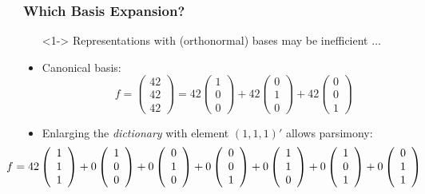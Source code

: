 \documentclass[dvips]{beamer}
\newcommand{\bs}[2]{\begin{frame} \frametitle{#1} 
{#2}
\end{frame} }
\begin{document}
\bs{Which Basis Expansion?}
{
  \begin{itemize}
  \item[]<1-> Representations with (orthonormal) bases may be inefficient $\ldots$ \\

\item<1->Canonical  basis:
\[f = \left( \begin{array}{c} 42 \\ 42 \\ 42 \end{array} \right) 
  = 42 \left( \begin{array}{c} 1 \\ 0 \\ 0 \end{array} \right) +
    42 \left( \begin{array}{c} 0 \\ 1 \\ 0 \end{array} \right) +
    42\left( \begin{array}{c} 0 \\ 0 \\ 1 \end{array} \right)\]
\item<2-> Enlarging the \textit{dictionary} with element
    $(1,1,1)'$ allows  parsimony:
\[\hspace{-.5in} f %
  = 42 \left( \begin{array}{c} 1 \\ 1 \\ 1 \end{array} \right) +
    0 \left( \begin{array}{c} 1 \\ 0 \\ 0 \end{array} \right) +
    0 \left( \begin{array}{c} 0 \\ 1 \\ 0 \end{array} \right) +
    0 \left( \begin{array}{c} 0 \\ 0 \\ 1 \end{array} \right)  +
    0 \left( \begin{array}{c} 1 \\ 1 \\ 0 \end{array} \right)  +
    0 \left( \begin{array}{c} 1 \\ 0 \\ 1 \end{array} \right)  +
    0 \left( \begin{array}{c} 0 \\ 1 \\ 1 \end{array} \right)  
\]
  \end{itemize}

}
\end{document}
